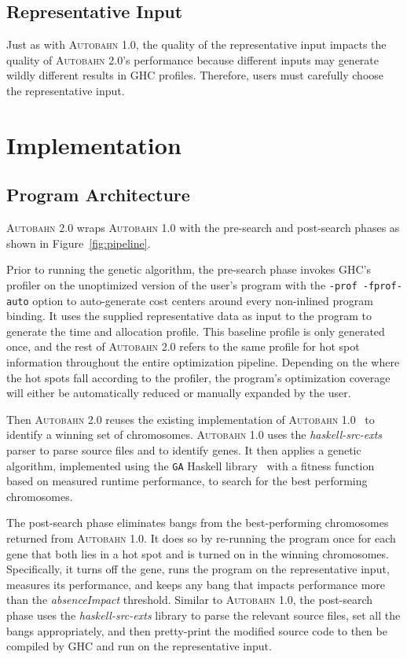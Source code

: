 \documentclass[format=sigplan, review=true]{acmart}
\newcommand{\figref}[1]{Figure~\ref{#1}}
\newcommand{\hotspot}[0]{hot spot}
\newcommand{\hotspots}[0]{hot spots}
\newcommand{\Ao}[0]{\textsc{Autobahn 1.0}}
\newcommand{\At}[0]{\textsc{Autobahn 2.0}}
\newcommand{\preopt}[0]{pre-search}
\newcommand{\postopt}[0]{post-search}
\newcommand{\absim}[0]{\textit{absenceImpact}}
\begin{document}
\subsection{Representative Input}
Just as with \Ao{}, the quality of the representative input impacts the quality of
\At{}'s performance because different inputs may
generate wildly different results in GHC profiles. Therefore, users
must carefully choose the representative input.


\section{Implementation}

\subsection{Program Architecture}
\At{} wraps \Ao{} with the  \preopt{} and \postopt{} phases as shown
in \figref{fig:pipeline}.  

Prior to running the genetic algorithm, the \preopt{} phase invokes
GHC's profiler on the unoptimized version of the user's program with
the \texttt{-prof -fprof-auto} option to auto-generate cost centers
around every non-inlined program binding.  It uses the supplied
representative data as input to the program to generate the time and
allocation profile.  This baseline profile is only generated once, and
the rest of \At{} refers to the same profile for \hotspot{}
information throughout the entire optimization pipeline.
Depending on the where the \hotspots{} fall according to the profiler, 
the program's optimization coverage will either be
automatically reduced or manually expanded by the user.

Then \At{} reuses the existing implementation
of \Ao{}~\cite{autobahn-wang} to identify a winning set of 
chromosomes.
\Ao{} uses the \textit{haskell-src-exts}~\cite{langexts} parser to parse
source files and to identify genes.  
It then applies a genetic algorithm,
implemented using the \texttt{GA} Haskell library~\cite{genetic}
with a fitness function based on measured runtime performance, to search for the best performing chromosomes.

The \postopt{} phase eliminates bangs from the best-performing
chromosomes returned from \Ao{}.  It does so by re-running the program
once for each gene that both lies in a \hotspot{} and is turned on in
the winning chromosomes.  Specifically, it turns off the gene, runs
the program on the representative input, measures its performance, and
keeps any bang that impacts performance more than the \absim{}
threshold.  Similar to \Ao{}, the \postopt{} phase uses
the \textit{haskell-src-exts} library to parse the relevant source
files, set all the bangs appropriately, and then pretty-print the
modified source code to then be compiled by GHC and run on the
representative input. 
\end{document}
